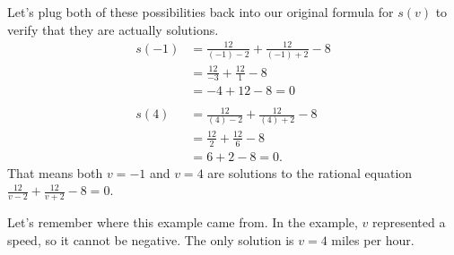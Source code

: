 \documentclass[nooutcomes]{ximera}
\begin{document}
\begin{example}
\begin{explanation}
			Let's plug both of these possibilities back into our original formula for $s(v)$ to verify that they are actually solutions.
			\begin{align*}
				s(-1) &= \frac{12}{(-1)-2}+\frac{12}{(-1)+2}-8\\
					&= \frac{12}{-3} + \frac{12}{1}-8\\
					&= -4 + 12 - 8 = 0 \\ \\
				s(4) &= \frac{12}{(4)-2}+\frac{12}{(4)+2}-8\\
					&= \frac{12}{2} + \frac{12}{6}-8\\
					&= 6 + 2 - 8 = 0.
			\end{align*}	
			That means both $v=-1$ and $v=4$ are solutions to the rational equation $\frac{12}{v-2}+\frac{12}{v+2}-8 = 0$. 

			Let's remember where this example came from. In the example, $v$ represented a speed, so it cannot be negative. The only solution is $v = 4$ miles per hour.

		\end{explanation}
	\end{example}
\end{document}
